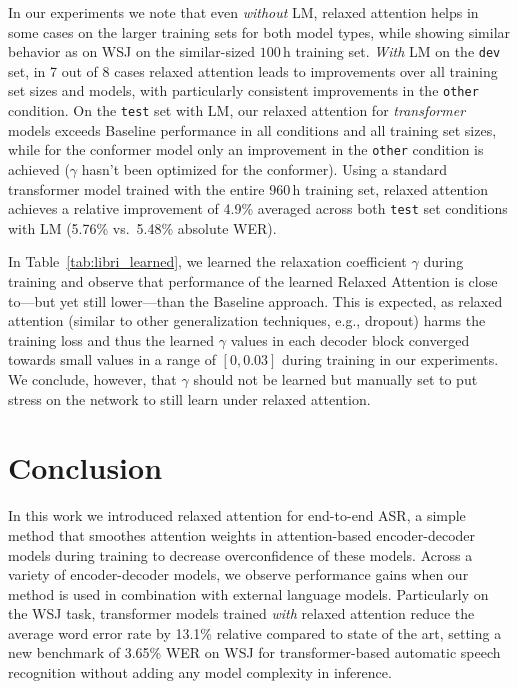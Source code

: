 \documentclass{article}
\begin{document}
In our experiments we note that even \textit{without} LM, relaxed attention helps in some cases on the larger training sets for both model types, while showing similar behavior as on WSJ on the similar-sized $100$\,h training set. \textit{With} LM on the \texttt{dev} set, in 7 out of 8 cases relaxed attention leads to improvements over all training set sizes and models, with particularly consistent improvements in the \texttt{other} condition. On the \texttt{test} set with LM, our relaxed attention for \textit{transformer} models exceeds \textsf{Baseline} performance in all conditions and all training set sizes, while for the conformer model only an improvement in the \texttt{other} condition is achieved ($\gamma$ hasn't been optimized for the conformer). Using a standard transformer model trained with the entire $960$\,h training set, relaxed attention achieves a relative improvement of 4.9\% averaged across both \texttt{test} set conditions with LM (5.76\% vs.\ 5.48\% absolute WER).

In Table~\ref{tab:libri_learned}, we learned the relaxation coefficient $\gamma$ during training and observe that performance of the learned \textsf{Relaxed Attention} is close to---but yet still lower---than the \textsf{Baseline} approach. This is expected, as relaxed attention (similar to other generalization techniques, e.g., dropout) harms the training loss and thus the learned $\gamma$ values in each decoder block converged towards small values in a range of $[0, 0.03]$ during training in our experiments. We conclude, however, that $\gamma$ should not be learned but manually set to put stress on the network to still learn under relaxed attention. 
\vspace{-2mm}
\section{Conclusion}\vspace{-3mm}
In this work we introduced relaxed attention for end-to-end ASR, a simple method that smoothes attention weights in attention-based encoder-decoder models during training to decrease overconfidence of these models. Across a variety of encoder-decoder models, we observe performance gains when our method is used in combination with external language models. Particularly on the WSJ task, transformer models trained \textit{with} relaxed attention reduce the average word error rate by 13.1\% relative compared to state of the art, setting a new benchmark of 3.65\% WER on WSJ for transformer-based automatic speech recognition without adding any model complexity in inference.   
\end{document}
